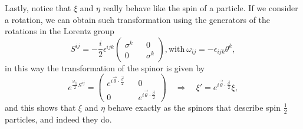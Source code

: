 Lastly, notice that $\xi$ and $\eta$ really behave like the spin of a particle. If we consider a rotation, we can obtain such transformation using the generators of the rotations in the Lorentz group
\begin{equation*}
    S^{ij}=-\frac{i}{2}\epsilon^{ijk}\begin{pmatrix}
        \sigma^k&&0\\0&&\sigma^k
    \end{pmatrix}, \text{with}\ \omega_{ij}=-\epsilon_{ijk}\theta^k, 
\end{equation*} 
in this way the transformation of the spinor is given by
\begin{equation*}
    e^{\frac{\omega_{ij}}{2}S^{ij}}=\begin{pmatrix}
        e^{i\vec\theta\cdot\frac{\vec\sigma}{2}}&&0\\0&&e^{i\vec\theta\cdot\frac{\vec\sigma}{2}}
    \end{pmatrix}\quad\Rightarrow\quad\xi'=e^{i\vec\theta\cdot\frac{\vec\sigma}{2}}\xi,
\end{equation*}
and this shows that $\xi$ and $\eta$ behave  exactly as the spinors that describe spin $\frac{1}{2}$ particles, and indeed they do.
